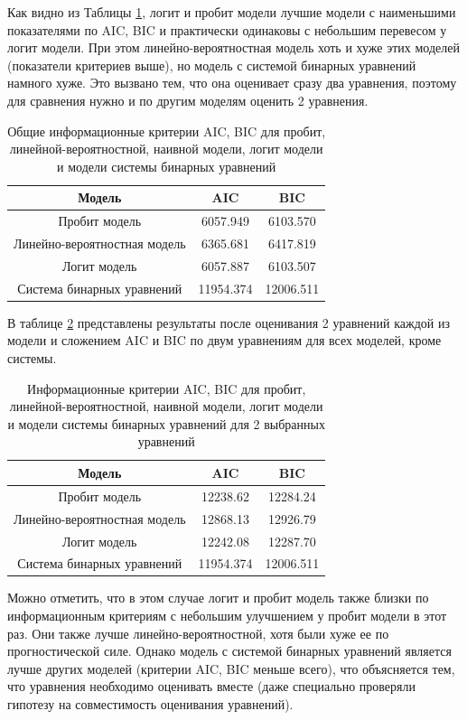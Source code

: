 \documentclass[a4paper,12pt]{article}
\begin{document}
	Как видно из Таблицы \ref{aicmodels}, логит и пробит модели лучшие модели с наименьшими показателями по AIC, BIC и практически одинаковы с небольшим перевесом у логит модели. При этом линейно-вероятностная модель хоть и хуже этих моделей (показатели критериев выше), но модель с системой бинарных уравнений намного хуже. Это вызвано тем, что она оценивает сразу два уравнения, поэтому для сравнения нужно и по другим моделям оценить 2 уравнения. 
	
	\begin{table}[!h]
		\caption{Общие информационные критерии AIC, BIC для пробит, линейной-вероятностной, наивной модели, логит модели и модели системы бинарных уравнений}
		\label{aicmodels}
		\centering
		\begin{tabular}{|c|c|c|}
			\hline
			Модель  &  AIC&BIC  \\ 
			\hline
			Пробит модель& 6057.949&6103.570\\
			\hline
			Линейно-вероятностная модель &6365.681&6417.819\\		
			\hline
			Логит модель&6057.887&6103.507\\	
			\hline
			Система бинарных уравнений&11954.374&12006.511\\	
			\hline
		\end{tabular}
	\end{table}

	В таблице \ref{aicbicmodels} представлены результаты после оценивания 2 уравнений каждой из модели и сложением AIC и BIC по двум уравнениям для всех моделей, кроме системы. 
	
	\begin{table}[!h]
		\caption{Информационные критерии AIC, BIC для пробит, линейной-вероятностной, наивной модели, логит модели и модели системы бинарных уравнений для 2 выбранных уравнений}
		\label{aicbicmodels}
		\centering
		\begin{tabular}{|c|c|c|}
			\hline
			Модель  &  AIC&BIC  \\ 
			\hline
			Пробит модель& 12238.62&12284.24\\
			\hline
			Линейно-вероятностная модель &12868.13&12926.79\\		
			\hline
			Логит модель&12242.08&12287.70\\	
			\hline
			Система бинарных уравнений&11954.374&12006.511\\	
			\hline
		\end{tabular}
	\end{table}
	
	Можно отметить, что в этом случае логит и пробит модель также близки по информационным критериям с небольшим улучшением у пробит модели в этот раз. Они также  лучше линейно-вероятностной, хотя были хуже ее по прогностической силе. Однако модель с системой бинарных уравнений является лучше других моделей (критерии AIC, BIC меньше всего), что объясняется тем, что уравнения необходимо оценивать вместе (даже специально проверяли гипотезу на совместимость оценивания уравнений).
	
\end{document}

